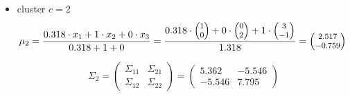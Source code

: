 \documentclass[12pt]{article}
\begin{document}
\begin{enumerate}
\begin{enumerate}[label=\arabic*)]
\begin{itemize}[label=]
    \vspace{20pt}
    \item{cluster $c=2$}
    \begin{equation*}
        \footnotesize
        \mu_2 = \frac{0.318 \cdot x_1 + 1 \cdot x_2 + 0 \cdot x_3}{0.318+1+0} = \frac{0.318 \cdot \begin{pmatrix}
        1\\
        0
        \end{pmatrix}+ 0 \cdot \begin{pmatrix}
        0\\
        2
        \end{pmatrix} + 1 \cdot \begin{pmatrix}
        3\\
        -1
        \end{pmatrix}}{1.318} = \begin{pmatrix}
        2.517\\
        -0.759
        \end{pmatrix}\\
    \end{equation*}

    \begin{equation*}
        \Sigma_2 = \begin{pmatrix}
            \Sigma_{11} & \Sigma_{21} \\
            \Sigma_{12} & \Sigma_{22}
        \end{pmatrix} = \begin{pmatrix}
            5.362 & -5.546 \\
            -5.546 & 7.795
        \end{pmatrix}
    \end{equation*}


\end{itemize}
\end{enumerate}
\end{enumerate}
\end{document}

